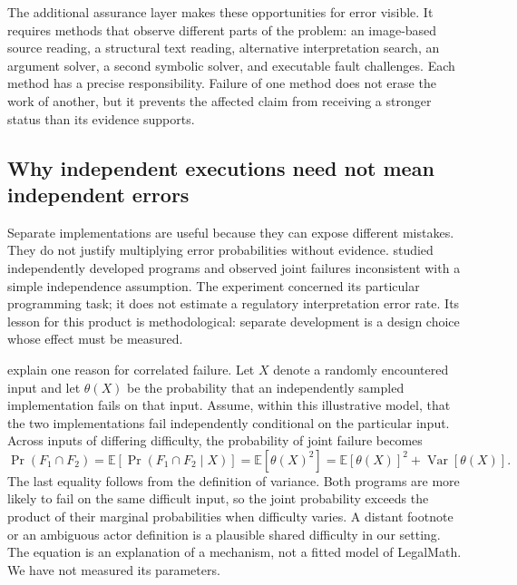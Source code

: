 \documentclass[12pt,a4paper,oneside,openany]{book}
\begin{document}
The additional assurance layer makes these opportunities for error visible. It
requires methods that observe different parts of the problem: an image-based
source reading, a structural text reading, alternative interpretation search,
an argument solver, a second symbolic solver, and executable fault challenges.
Each method has a precise responsibility. Failure of one method does not erase
the work of another, but it prevents the affected claim from receiving a stronger
status than its evidence supports.

\subsection{Why independent executions need not mean independent errors}

Separate implementations are useful because they can expose different mistakes.
They do not justify multiplying error probabilities without evidence.
\citet{knight1986diversity} studied independently developed programs and observed
joint failures inconsistent with a simple independence assumption. The experiment
concerned its particular programming task; it does not estimate a regulatory
interpretation error rate. Its lesson for this product is methodological:
separate development is a design choice whose effect must be measured.

\citet[section 4.1]{littlewood2001diversity} explain one reason for correlated
failure. Let $X$ denote a randomly encountered input and let $\theta(X)$ be the
probability that an independently sampled implementation fails on that input.
Assume, within this illustrative model, that the two implementations fail
independently conditional on the particular input. Across inputs of differing
difficulty, the probability of joint failure becomes
\begin{equation}
 \Pr(F_1\cap F_2)
 = \mathbb{E}[\Pr(F_1\cap F_2\mid X)]
 = \mathbb{E}[\theta(X)^2]
 = \mathbb{E}[\theta(X)]^2+\operatorname{Var}[\theta(X)].
 \label{eq:round11-shared-difficulty}
\end{equation}
The last equality follows from the definition of variance. Both programs are
more likely to fail on the same difficult input, so the joint probability exceeds
the product of their marginal probabilities when difficulty varies. A distant
footnote or an ambiguous actor definition is a plausible shared difficulty in
our setting. The equation is an explanation of a mechanism, not a fitted model
of LegalMath. We have not measured its parameters.
\end{document}
